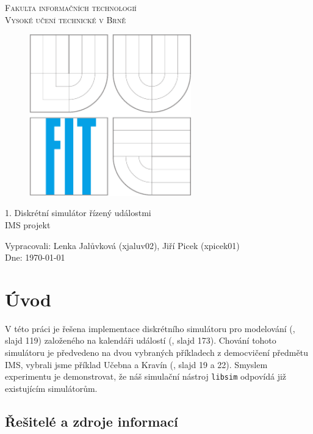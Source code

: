 \documentclass[12pt,a4paper,titlepage,final]{article}
\begin{document}
\begin{titlepage}
\begin{center}
{\Large\textsc{Fakulta informačních technologií}}\\
{\Large \textsc{Vysoké učení technické v Brně}}\\

\begin{figure}[!h]
 	\centering
	 \includegraphics[height=7cm]{fit-zp2.pdf}
\end{figure}

{\Huge 1. Diskrétní simulátor řízený událostmi}\\
\LARGE
IMS projekt\\ 
\end{center}
{\Large
Vypracovali: Lenka Jalůvková (xjaluv02), Jiří Picek (xpicek01)} \\
{\Large Dne: \today}
\end{titlepage}


\newpage
\section{Úvod} \label{uvod}

V této práci je řešena implementace diskrétního simulátoru pro modelování (\cite{peringer}, slajd 119) založeného na kalendáři událostí (\cite{peringer}, slajd 173). Chování tohoto simulátoru je předvedeno na dvou vybraných příkladech z democvičení předmětu IMS, vybrali jsme příklad Učebna a Kravín (\cite{demo1}, slajd 19 a 22).
Smyslem experimentu je demonstrovat, že náš simulační nástroj \texttt{libsim} odpovídá již existujícím simulátorům.

\subsection{Řešitelé a zdroje informací}
\end{document}

